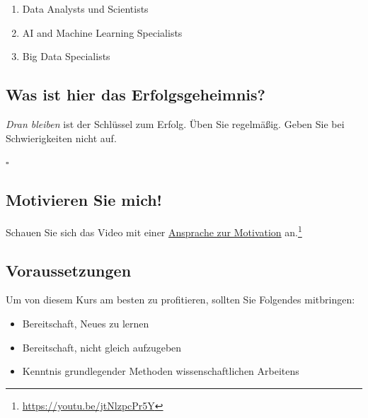 \documentclass[
  a4paper,
  DIV=11]{scrreprt}
\providecommand{\tightlist}{%
  \setlength{\itemsep}{0pt}\setlength{\parskip}{0pt}}\usepackage{longtable,booktabs,array}
\theoremstyle{definition}
\theoremstyle{definition}
\theoremstyle{definition}
\theoremstyle{remark}
\begin{document}
\begin{enumerate}
\def\labelenumi{\arabic{enumi}.}
\tightlist
\item
  Data Analysts und Scientists
\item
  AI and Machine Learning Specialists
\item
  Big Data Specialists
\end{enumerate}

\subsection{Was ist hier das
Erfolgsgeheimnis?}\label{was-ist-hier-das-erfolgsgeheimnis}

\begin{tcolorbox}[enhanced jigsaw, leftrule=.75mm, opacitybacktitle=0.6, colback=white, colframe=quarto-callout-important-color-frame, coltitle=black, colbacktitle=quarto-callout-important-color!10!white, opacityback=0, left=2mm, breakable, titlerule=0mm, toptitle=1mm, bottomtitle=1mm, rightrule=.15mm, title=\textcolor{quarto-callout-important-color}{\faExclamation}\hspace{0.5em}{Wichtig}, arc=.35mm, bottomrule=.15mm, toprule=.15mm]

\emph{Dran bleiben} ist der Schlüssel zum Erfolg. Üben Sie regelmäßig.
Geben Sie bei Schwierigkeiten nicht auf.

 
  \(\square\)

\end{tcolorbox}

\subsection{Motivieren Sie mich!}\label{motivieren-sie-mich}

Schauen Sie sich das Video mit einer
\href{https://youtu.be/jtNlzpcPr5Y}{Ansprache zur Motivation}
an.\footnote{\url{https://youtu.be/jtNlzpcPr5Y}}

\subsection{Voraussetzungen}\label{voraussetzungen}

Um von diesem Kurs am besten zu profitieren, sollten Sie Folgendes
mitbringen:

\begin{itemize}
\tightlist
\item
  Bereitschaft, Neues zu lernen
\item
  Bereitschaft, nicht gleich aufzugeben
\item
  Kenntnis grundlegender Methoden wissenschaftlichen Arbeitens
\end{itemize}
\end{document}
